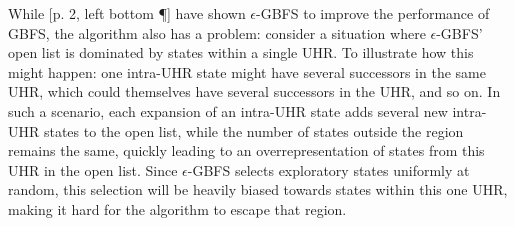 
While [p. 2, left bottom \P] have shown $\epsilon$-GBFS to improve the performance of GBFS, the algorithm also has a problem: consider a situation where $\epsilon$-GBFS' open list is dominated by states within a single UHR. To illustrate how this might happen: one intra-UHR state might have several successors in the same UHR, which could themselves have several successors in the UHR, and so on. In such a scenario, each expansion of an intra-UHR state adds several new intra-UHR states to the open list, while the number of states outside the region remains the same, quickly leading to an overrepresentation of states from this UHR in the open list. Since $\epsilon$-GBFS selects exploratory states uniformly at random, this selection will be heavily biased towards states within this one UHR, making it hard for the algorithm to escape that region.





